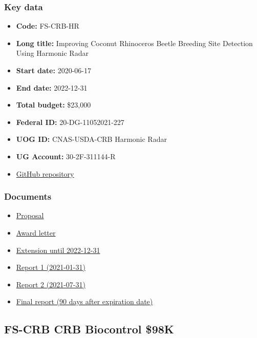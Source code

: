 \subsubsection{Key data}
\begin{itemize}
	\setlength\itemsep{0em}
	\item \textbf{Code:} FS-CRB-HR
	\item \textbf{Long title:} Improving Coconut Rhinoceros Beetle Breeding Site Detection Using Harmonic Radar
	\item \textbf{Start date:} 2020-06-17
	\item \textbf{End date:} 2022-12-31
	\item \textbf{Total budget:} \$23,000
	\item \textbf{Federal ID:} 20-DG-11052021-227
	\item \textbf{UOG ID:} CNAS-USDA-CRB Harmonic Radar
	\item \textbf{UG Account:} 30-2F-311144-R
	\item \href{https://github.com/aubreymoore/Harmonic-Radar}{GitHub repository}
\end{itemize}

\subsubsection{Documents}
\begin{itemize}
	\setlength\itemsep{0em}		
	\item \href{https://github.com/aubreymoore/Harmonic-Radar/blob/master/USFS-harmonic-radar-proposal.pdf}{Proposal}
	\item \href{https://github.com/aubreymoore/grant-tracker/blob/main/mydocs/20-DG-227-UOG-CRB-Harmonic-Radar-Fully-Signed-Grant.pdf}{Award letter}
	\item \href{https://github.com/aubreymoore/grant-tracker/blob/main/mydocs/20-DG-227\%20UOG\%20Mod\%201\%20Fully\%20Signed.pdf}{Extension until 2022-12-31}
	\item \href{https://github.com/aubreymoore/Harmonic-Radar/raw/master/FS-CRB-HR-report1.pdf}{Report 1 (2021-01-31)}
	\item \href{}{Report 2 (2021-07-31)}
	\item \href{}{Final report (90 days after expiration date)}
\end{itemize}





\newpage
\subsection{FS-CRB CRB Biocontrol \$98K}
\label{FS-CRB}

